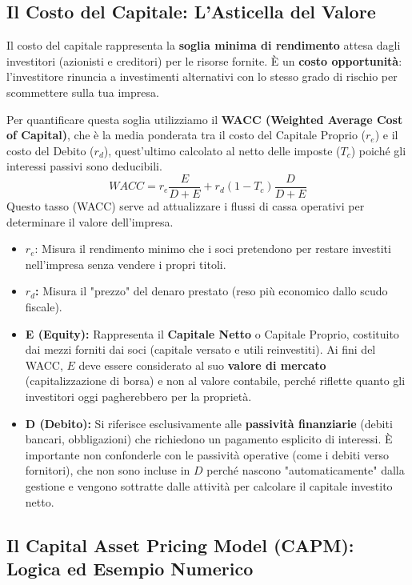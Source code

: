 \documentclass[a4paper,10pt]{article}
\begin{document}
\subsection*{Il Costo del Capitale: L'Asticella del Valore}

Il costo del capitale rappresenta la \textbf{soglia minima di rendimento} attesa dagli investitori (azionisti e creditori) per le risorse fornite. È un \textbf{costo opportunità}: l'investitore rinuncia a investimenti alternativi con lo stesso grado di rischio per scommettere sulla tua impresa.

Per quantificare questa soglia utilizziamo il \textbf{WACC (Weighted Average Cost of Capital)}, che è la media ponderata tra il costo del Capitale Proprio ($r_e$) e il costo del Debito ($r_d$), quest'ultimo calcolato al netto delle imposte ($T_c$) poiché gli interessi passivi sono deducibili.
\[ WACC = r_e \frac{E}{D+E} + r_d (1 - T_c) \frac{D}{D+E} \]
Questo tasso (WACC) serve ad attualizzare i flussi di cassa operativi per determinare il valore dell'impresa.
\begin{itemize}
    \item $r_e$: Misura il rendimento minimo che i soci pretendono per restare investiti nell'impresa senza vendere i propri titoli. 
    \item \textbf{$r_d$:} Misura il "prezzo" del denaro prestato (reso più economico dallo scudo fiscale).
    \item \textbf{E (Equity):} Rappresenta il \textbf{Capitale Netto} o Capitale Proprio, costituito dai mezzi forniti dai soci (capitale versato e utili reinvestiti). Ai fini del WACC, $E$ deve essere considerato al suo \textbf{valore di mercato} (capitalizzazione di borsa) e non al valore contabile, perché riflette quanto gli investitori oggi pagherebbero per la proprietà.
    \item \textbf{D (Debito):} Si riferisce esclusivamente alle \textbf{passività finanziarie} (debiti bancari, obbligazioni) che richiedono un pagamento esplicito di interessi. È importante non confonderle con le passività operative (come i debiti verso fornitori), che non sono incluse in $D$ perché nascono "automaticamente" dalla gestione e vengono sottratte dalle attività per calcolare il capitale investito netto.
\end{itemize}

\subsection*{Il Capital Asset Pricing Model (CAPM): Logica ed Esempio Numerico}
\end{document}
